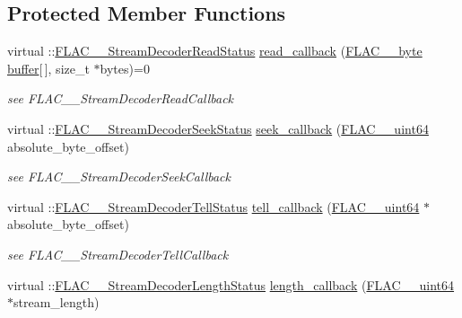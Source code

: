 \subsection*{Protected Member Functions}
\begin{DoxyCompactItemize}
\item 
virtual \+::\hyperlink{group__flac__stream__decoder_gad793ead451206c64a91dc0b851027b93}{F\+L\+A\+C\+\_\+\+\_\+\+Stream\+Decoder\+Read\+Status} \hyperlink{class_f_l_a_c_1_1_decoder_1_1_stream_af91735b6c715ca648493e837f513ef3d}{read\+\_\+callback} (\hyperlink{ordinals_8h_a5eb569b12d5b047cdacada4d57924ee3}{F\+L\+A\+C\+\_\+\+\_\+byte} \hyperlink{structbuffer}{buffer}\mbox{[}$\,$\mbox{]}, size\+\_\+t $\ast$bytes)=0
\begin{DoxyCompactList}\small\item\em see F\+L\+A\+C\+\_\+\+\_\+\+Stream\+Decoder\+Read\+Callback \end{DoxyCompactList}\item 
virtual \+::\hyperlink{group__flac__stream__decoder_gac8d269e3c7af1a5889d3bd38409ed67d}{F\+L\+A\+C\+\_\+\+\_\+\+Stream\+Decoder\+Seek\+Status} \hyperlink{class_f_l_a_c_1_1_decoder_1_1_stream_a159620053a7ae9fbe2d61ec5bf31ea9d}{seek\+\_\+callback} (\hyperlink{ordinals_8h_aa78c8c70a3eb8a58af7436f278acde8e}{F\+L\+A\+C\+\_\+\+\_\+uint64} absolute\+\_\+byte\+\_\+offset)
\begin{DoxyCompactList}\small\item\em see F\+L\+A\+C\+\_\+\+\_\+\+Stream\+Decoder\+Seek\+Callback \end{DoxyCompactList}\item 
virtual \+::\hyperlink{group__flac__stream__decoder_ga83708207969383bd7b5c1e9148528845}{F\+L\+A\+C\+\_\+\+\_\+\+Stream\+Decoder\+Tell\+Status} \hyperlink{class_f_l_a_c_1_1_decoder_1_1_stream_ab7766b9c46c504963188d14c713e0178}{tell\+\_\+callback} (\hyperlink{ordinals_8h_aa78c8c70a3eb8a58af7436f278acde8e}{F\+L\+A\+C\+\_\+\+\_\+uint64} $\ast$absolute\+\_\+byte\+\_\+offset)
\begin{DoxyCompactList}\small\item\em see F\+L\+A\+C\+\_\+\+\_\+\+Stream\+Decoder\+Tell\+Callback \end{DoxyCompactList}\item 
virtual \+::\hyperlink{group__flac__stream__decoder_gad5860157c2bb34501b8b9370472d727a}{F\+L\+A\+C\+\_\+\+\_\+\+Stream\+Decoder\+Length\+Status} \hyperlink{class_f_l_a_c_1_1_decoder_1_1_stream_acaf2fe0f12ccb3b0ed12adccc095e5e3}{length\+\_\+callback} (\hyperlink{ordinals_8h_aa78c8c70a3eb8a58af7436f278acde8e}{F\+L\+A\+C\+\_\+\+\_\+uint64} $\ast$stream\+\_\+length)

\end{DoxyCompactItemize}

